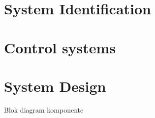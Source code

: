 {\section{System Identification}
\section{Control systems}

    
    
\section{System Design}
Blok diagram
komponente

}


